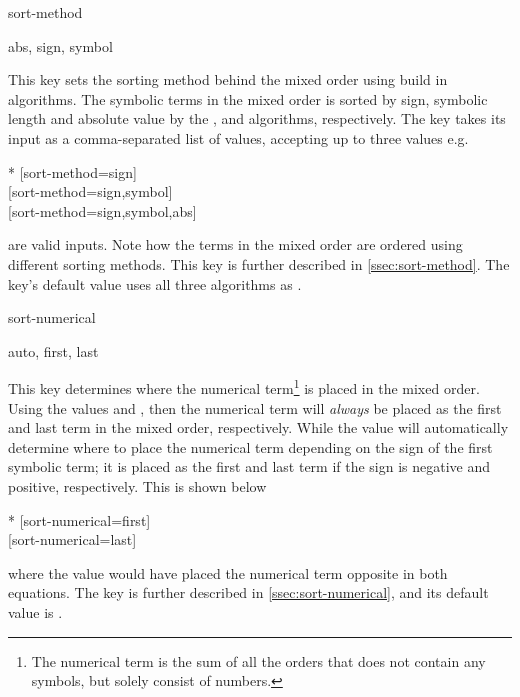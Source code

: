 \documentclass[final,british,10pt]{scrartcl}
\theoremstyle{remark}
\begin{document}
	\begin{option}{sort-method}
		\begin{values}[default = {sign, symbol, abs}]
			abs, sign, symbol
		\end{values}
		This key sets the sorting method behind the mixed order using build in algorithms. The symbolic terms in the mixed order is sorted by sign, symbolic length and absolute value by the ,  and  algorithms, respectively. The key takes its input as a comma-separated list of values, accepting up to three values e.g.
		
		\begin{example}*
			\derivset{\pdv}[sort-method=sign]               \\
			\derivset{\pdv}[sort-method={sign,symbol}]      \\
			\derivset{\pdv}[sort-method={sign,symbol,abs}] 
		\end{example}
		
		\noindent are valid inputs. Note how the terms in the mixed order are ordered using different sorting methods. This key is further described in \cref{ssec:sort-method}. The key's default value uses all three algorithms as \default.
	\end{option}
	
	\begin{option}{sort-numerical}
		\begin{values}[default = auto]
			auto, first, last
		\end{values}
		This key determines where the numerical term\footnote{The numerical term is the sum of all the orders that does not contain any symbols, but solely consist of numbers.\label{foot:numerical-term}} is placed in the mixed order. Using the values  and , then the numerical term will \emph{always} be placed as the first and last term in the mixed order, respectively. While the value  will automatically determine where to place the numerical term depending on the sign of the first symbolic term; it is placed as the first and last term if the sign is negative and positive, respectively. This is shown below
		
		\begin{example}*
			\derivset{\pdv}[sort-numerical=first] \pdv[n,2]{f}{x,y}  \\
			\derivset{\pdv}[sort-numerical=last]  \pdv[-n,2]{f}{x,y}
		\end{example}
		
		\noindent where the value  would have placed the numerical term opposite in both equations. The key is further described in \cref{ssec:sort-numerical}, and its default value is .
	\end{option}
	
\end{document}
